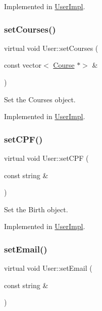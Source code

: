 Implemented in \hyperlink{classUserImpl_a1b79e70d839345e3ea0b05637183c1e1}{User\+Impl}.

\mbox{\label{classUser_a1b97c41fca71b2839d8acc57e9d006b2}} 
\subsubsection{\texorpdfstring{set\+Courses()}{setCourses()}}
{\footnotesize\ttfamily virtual void User\+::set\+Courses (\begin{DoxyParamCaption}\item[{const vector$<$ \hyperlink{classCourse}{Course} $\ast$$>$ \&}]{ }\end{DoxyParamCaption})\hspace{0.3cm}{\ttfamily [pure virtual]}}



Set the Courses object. 



Implemented in \hyperlink{classUserImpl_a0b01431638678ab1f7e39202c2374e4e}{User\+Impl}.

\mbox{\label{classUser_ac10d34adddaa80cb544eab7c5b1227f5}} 
\subsubsection{\texorpdfstring{set\+C\+P\+F()}{setCPF()}}
{\footnotesize\ttfamily virtual void User\+::set\+C\+PF (\begin{DoxyParamCaption}\item[{const string \&}]{ }\end{DoxyParamCaption})\hspace{0.3cm}{\ttfamily [pure virtual]}}



Set the Birth object. 



Implemented in \hyperlink{classUserImpl_a9964fc4ed651ce945f663cb4df8e042b}{User\+Impl}.

\mbox{\label{classUser_ac72e220fdcbb3decc392d2729f27e6b5}} 
\subsubsection{\texorpdfstring{set\+Email()}{setEmail()}}
{\footnotesize\ttfamily virtual void User\+::set\+Email (\begin{DoxyParamCaption}\item[{const string \&}]{ }\end{DoxyParamCaption})\hspace{0.3cm}{\ttfamily [pure virtual]}}



